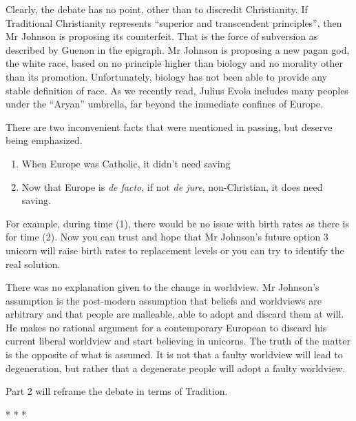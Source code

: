 Clearly, the debate has no point, other than to discredit Christianity. If Traditional Christianity represents ``superior and transcendent principles'', then Mr Johnson is proposing its counterfeit. That is the force of subversion as described by Guenon in the epigraph. Mr Johnson is proposing a new pagan god, the white race, based on no principle higher than biology and no morality other than its promotion. Unfortunately, biology has not been able to provide any stable definition of race. As we recently read, Julius Evola includes many peoples under the ``Aryan'' umbrella, far beyond the immediate confines of Europe.

There are two inconvenient facts that were mentioned in passing, but deserve being emphasized.

\begin{enumerate}


\item When Europe was Catholic, it didn't need saving

\item Now that Europe is \emph{de facto}, if not \emph{de jure}, non-Christian, it does need saving.
\end{enumerate}


For example, during time (1), there would be no issue with birth rates as there is for time (2). Now you can trust and hope that Mr Johnson's future option 3 unicorn will raise birth rates to replacement levels or you can try to identify the real solution.

There was no explanation given to the change in worldview. Mr Johnson's assumption is the post-modern assumption that beliefs and worldviews are arbitrary and that people are malleable, able to adopt and discard them at will. He makes no rational argument for a contemporary European to discard his current liberal worldview and start believing in unicorns. The truth of the matter is the opposite of what is assumed. It is not that a faulty worldview will lead to degeneration, but rather that a degenerate people will adopt a faulty worldview.

Part 2 will reframe the debate in terms of Tradition.



\begin{center}* * *\end{center}

